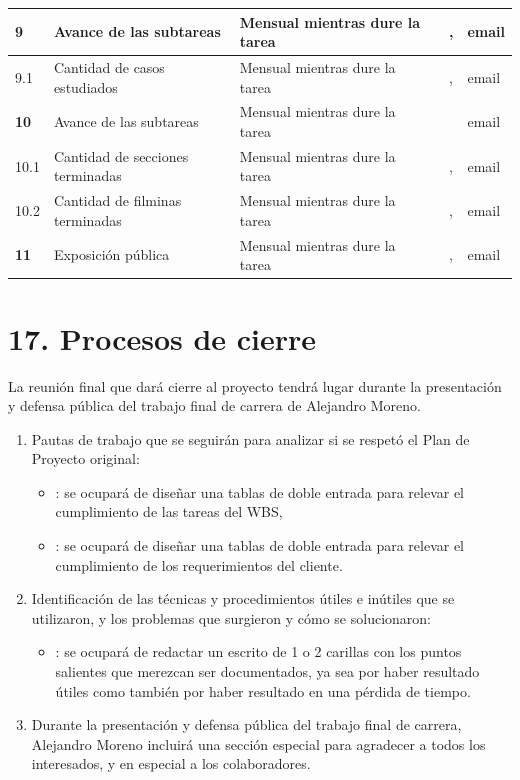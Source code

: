 \documentclass[11pt]{charter}
\begin{document}
\begin{longtable}{|m{1cm}|m{3.5cm}|m{2.2cm}|m{2cm}|m{3cm}|m{1.5cm}|}
\textbf{9}					& Avance de las subtareas   & Mensual mientras dure la tarea & \authorname & \clientename, \supname & email \\ \hline
9.1							& Cantidad de casos estudiados  & Mensual mientras dure la tarea & \authorname & \clientename, \supname & email \\ \hline
\rowcolor{lightgray!50}
\textbf{10}					& Avance de las subtareas  & Mensual mientras dure la tarea & \authorname & \clientename & email \\ \hline
10.1 						& Cantidad de secciones terminadas  & Mensual mientras dure la tarea & \authorname & \clientename, \supname & email \\ \hline
10.2 						& Cantidad de filminas terminadas  & Mensual mientras dure la tarea & \authorname & \clientename, \supname & email \\ \hline
\rowcolor{lightgray!50}
\textbf{11}					& Exposición pública  		& Mensual mientras dure la tarea & \authorname & \clientename, \supname & email \\ \hline
\end{longtable}


\section{17. Procesos de cierre}    
\label{sec:cierre}

La reunión final que dará cierre al proyecto tendrá lugar durante la presentación y defensa pública del trabajo final de carrera de Alejandro Moreno.

\begin{enumerate}
\item Pautas de trabajo que se seguirán para analizar si se respetó el Plan de Proyecto original:
	\begin{itemize}
		\item \authorname: se ocupará de diseñar una tablas de doble entrada para relevar el cumplimiento de las tareas del WBS, 
		\item \authorname: se ocupará de diseñar una tablas de doble entrada para relevar el cumplimiento de los requerimientos del cliente.
	\end{itemize}
	
\item Identificación de las técnicas y procedimientos útiles e inútiles que se utilizaron, y los problemas que surgieron y cómo se solucionaron:
	\begin{itemize}
		\item \authorname: se ocupará de redactar un escrito de 1 o 2 carillas con los puntos salientes que merezcan ser documentados, ya sea por 				haber resultado útiles como también por haber resultado en una pérdida de tiempo.
	\end{itemize}
\item Durante la presentación y defensa pública del trabajo final de carrera, Alejandro Moreno incluirá
una sección especial para agradecer a todos los interesados, y en especial a los colaboradores.
\end{enumerate}
\end{document}

